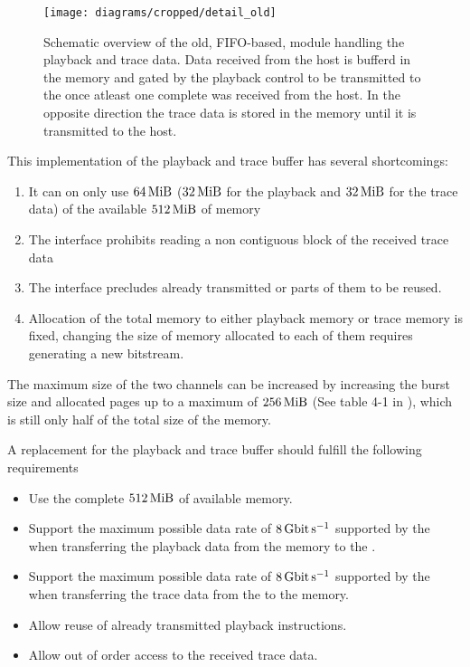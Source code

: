 \begin{figure}
\centerline{\texttt{[image: diagrams/cropped/detail\_old]}}
\caption{Schematic overview of the old, FIFO{}-based, module handling the playback and trace data. Data received from the host is bufferd in the \DDR{} memory and gated by the playback control to be transmitted to the \pbexec{} once atleast one complete \PlaybackProgram{} was received from the host. In the opposite direction the trace data is stored in the \DDR{} memory until it is transmitted to the host.}\label{diagram:detail_old}
\end{figure}


This implementation of the playback and trace buffer has several shortcomings:
\begin{enumerate}
  \item It can on only use \(\SI{64}{\mebi\byte}\) (\(\SI{32}{\mebi\byte}\) for the playback and \(\SI{32}{\mebi\byte}\) for the trace data) of the available $\SI{512}{\mebi\byte}$ of memory\label{point:limited_size}
  \item The \FIFO{} interface prohibits reading a non contiguous block of the received trace data
  \item The \FIFO{} interface precludes already transmitted \PlaybackProgram{} or parts of them to be reused.
  \item Allocation of the total memory to either playback memory or trace memory is fixed, changing the size of memory allocated to each of them requires generating a new \FPGA{} bitstream.
\end{enumerate}
The maximum size of the two \VFIFO{} channels can be increased by increasing the burst size and allocated pages up to a maximum of \(\SI{256}{\mebi\byte}\) (See table 4-1 in \autocite{ref:vfifo}), which is still only half of the total size of the memory.

A replacement for the playback and trace buffer should fulfill the following requirements
\begin{itemize}
  \item Use the complete $\SI{512}{\mebi\byte}$ of available memory.
  \item Support the maximum possible data rate of $\pbExecBandwidth{}$ supported by the \pbexec{} when transferring the playback data from the memory to the \pbexec{}.
  \item Support the maximum possible data rate of $\pbExecBandwidth{}$ supported by the \pbexec{} when transferring the trace data from the \pbexec{} to the memory.
  \item Allow reuse of already transmitted playback instructions.
  \item Allow out of order access to the received trace data.
\end{itemize}
